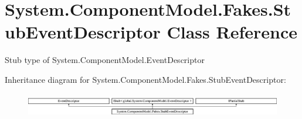 \hypertarget{class_system_1_1_component_model_1_1_fakes_1_1_stub_event_descriptor}{\section{System.\-Component\-Model.\-Fakes.\-Stub\-Event\-Descriptor Class Reference}
\label{class_system_1_1_component_model_1_1_fakes_1_1_stub_event_descriptor}
}


Stub type of System.\-Component\-Model.\-Event\-Descriptor 


Inheritance diagram for System.\-Component\-Model.\-Fakes.\-Stub\-Event\-Descriptor\-:\begin{figure}[H]
\begin{center}
\leavevmode
\includegraphics[height=1.075889cm]{class_system_1_1_component_model_1_1_fakes_1_1_stub_event_descriptor}
\end{center}
\end{figure}
